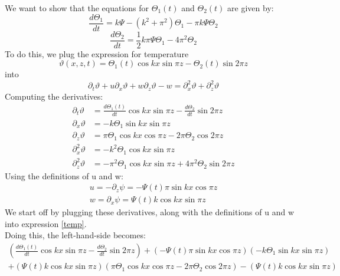 \documentclass{article}
\begin{document}
We want to show that the equations for $\Theta_1(t)$ and $\Theta_2(t)$ are given by:
\begin{equation}\label{T1}
    \frac{d\Theta_1}{dt} = k\Psi - (k^2 + \pi^2)\Theta_1 - \pi k \Psi \Theta_2
\end{equation}
\begin{equation}\label{T2}
    \frac{d\Theta_2}{dt} = \frac{1}{2}k\pi \Psi \Theta_1 - 4\pi^2\Theta_2
\end{equation}
To do this, we plug the expression for temperature
\begin{equation}
    \vartheta(x,z,t) = \Theta_1(t)\cos kx \sin \pi z - \Theta_2(t)\sin 2\pi z
\end{equation}
into
\begin{equation}\label{temp}
    \partial_t \vartheta + u\partial_x \vartheta + w\partial_z \vartheta - w = \partial^2_x \vartheta + \partial^2_z \vartheta
\end{equation} 
Computing the derivatives:
\begin{align*}
    \partial_t \vartheta &= \frac{d\Theta_1(t)}{dt}\cos kx \sin \pi z - \frac{d\Theta_2}{dt}\sin 2\pi z \\
    \partial_x \vartheta &= -k \Theta_1 \sin kx \sin \pi z \\
    \partial_z \vartheta &= \pi \Theta_1 \cos kx \cos \pi z - 2\pi \Theta_2 \cos 2\pi z \\
    \partial^2_x \vartheta &= -k^2 \Theta_1 \cos kx \sin \pi z \\
    \partial^2_z \vartheta &= -\pi^2 \Theta_1 \cos kx \sin \pi z + 4\pi^2 \Theta_2 \sin 2\pi z
\end{align*}
Using the definitions of u and w:
\begin{align*}
    u = -\partial_z \psi = -\Psi(t) \pi \sin kx \cos \pi z \\
    w = \partial_x \psi = \Psi(t) k \cos kx \sin \pi z
\end{align*}
We start off by plugging these derivatives, along with the definitions of u and w into expression \ref{temp}. \\
Doing this, the left-hand-side becomes:
\begin{align*}
    \left(\frac{d\Theta_1(t)}{dt}\cos kx \sin \pi z - \frac{d\Theta_2}{dt}\sin 2\pi z\right) + \left(-\Psi(t) \pi \sin kx \cos \pi z\right)\left(-k \Theta_1 \sin kx \sin \pi z\right) \\ + \left(\Psi(t) k \cos kx \sin \pi z\right)\left(\pi \Theta_1 \cos kx \cos \pi z - 2\pi \Theta_2 \cos 2\pi z\right) - \left(\Psi(t) k \cos kx \sin \pi z\right)
\end{align*}
\end{document}
